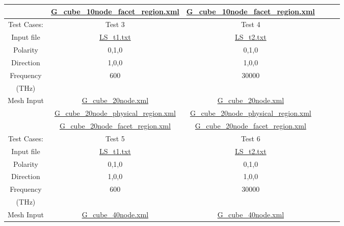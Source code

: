 \documentclass[12pt, titlepage]{article}
\begin{document}
\begin{enumerate}
\begin{table}[h!]
\begin{tabular}{|c|c|c|c|c|c|}
			& \href{https://github.com/shmouses/SPDFM/tree/master/src/G_cube_10node_facet_region.xml}{G\_cube\_10node\_facet\_region.xml} &
			\href{https://github.com/shmouses/SPDFM/tree/master/src/G_cube_10node_facet_region.xml}{G\_cube\_10node\_facet\_region.xml} \\\hline
			
			Test Cases: & Test 3 & Test 4 \\
			\hline 
			Input file & \href{https://github.com/shmouses/SPDFM/tree/master/src/LS_t1.txt}{LS\_t1.txt} & \href{https://github.com/shmouses/SPDFM/tree/master/src/LS_t2.txt}{LS\_t2.txt} \\
			Polarity  & 0,1,0 & 0,1,0 \\
			Direction & 1,0,0 & 1,0,0 \\
			Frequency &   600 & 30000 \\
			(THz) & & \\ \hline
			Mesh Input & \href{https://github.com/shmouses/SPDFM/tree/master/src/G_cube_20node.xml}{G\_cube\_20node.xml} & \href{https://github.com/shmouses/SPDFM/tree/master/src/G_cube_20node.xml}{G\_cube\_20node.xml} \\
			 
			& \href{https://github.com/shmouses/SPDFM/tree/master/src/G_cube_20node_physical_region.xml}{G\_cube\_20node\_physical\_region.xml} &
			\href{https://github.com/shmouses/SPDFM/tree/master/src/G_cube_20node_physical_region.xml}{G\_cube\_20node\_physical\_region.xml} \\
			
			& \href{https://github.com/shmouses/SPDFM/tree/master/src/G_cube_20node_facet_region.xml}{G\_cube\_20node\_facet\_region.xml} &
			\href{https://github.com/shmouses/SPDFM/tree/master/src/G_cube_20node_facet_region.xml}{G\_cube\_20node\_facet\_region.xml} \\		
			\hline
			
			Test Cases: & Test 5 & Test 6 \\
			\hline 
			Input file & \href{https://github.com/shmouses/SPDFM/tree/master/src/LS_t1.txt}{LS\_t1.txt} & \href{https://github.com/shmouses/SPDFM/tree/master/src/LS_t2.txt}{LS\_t2.txt} \\
			Polarity  & 0,1,0 & 0,1,0 \\
			Direction & 1,0,0 & 1,0,0 \\
			Frequency &   600 & 30000 \\
			(THz) & & \\ \hline
			Mesh Input & \href{https://github.com/shmouses/SPDFM/tree/master/src/G_cube_40node.xml}{G\_cube\_40node.xml} & \href{https://github.com/shmouses/SPDFM/tree/master/src/G_cube_40node.xml}{G\_cube\_40node.xml} \\
			

\end{tabular}
\end{table}
\end{enumerate}
\end{document}
